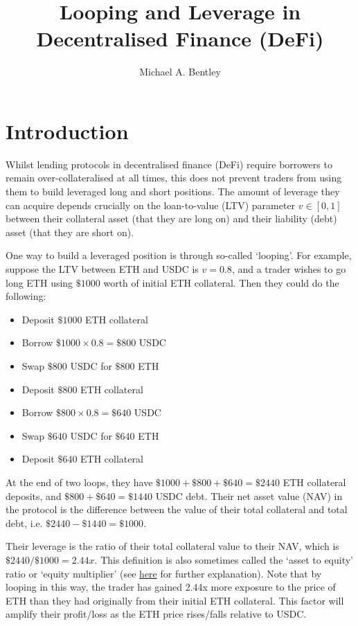 \documentclass[bibliography=numbered]{article}
\title{Looping and Leverage in Decentralised Finance (DeFi)}
\author{Michael A. Bentley}
\date{}
\begin{document}
\maketitle

\section{Introduction}

Whilst lending protocols in decentralised finance (DeFi) require borrowers to remain over-collateralised at all times, this does not prevent traders from using them to build leveraged long and short positions. The amount of leverage they can acquire depends crucially on the loan-to-value (LTV) parameter $v \in [0, 1]$ between their collateral asset (that they are long on) and their liability (debt) asset (that they are short on). 

One way to build a leveraged position is through so-called `looping'. For example, suppose the LTV between ETH and USDC is $v = 0.8$, and a trader wishes to go long ETH using $\$1000$ worth of initial ETH collateral. Then they could do the following:

\begin{itemize}
    \item Deposit $\$1000$ ETH collateral
    \item Borrow $\$1000 \times 0.8 = \$800$ USDC
    \item Swap $\$800$ USDC for $\$800$ ETH
    \item Deposit $\$800$ ETH collateral
    \item Borrow $\$800 \times 0.8 = \$640$ USDC
    \item Swap $\$640$ USDC for $\$640$ ETH
    \item Deposit $\$640$ ETH collateral
\end{itemize}

At the end of two loops, they have $\$1000 + \$800 + \$640 = \$2440$ ETH collateral deposits, and $\$800 + \$640 = \$1440$ USDC debt. Their net asset value (NAV) in the protocol is the difference between the value of their total collateral and total debt, i.e. $\$2440 - \$1440 = \$1000$. 

Their leverage is the ratio of their total collateral value to their NAV, which is $\$2440 / \$1000 = 2.44x$. This definition is also sometimes called the `asset to equity' ratio or `equity multiplier' (see \href{https://corporatefinanceinstitute.com/resources/valuation/equity-multiplier/}{here} for further explanation). Note that by looping in this way, the trader has gained 2.44x more exposure to the price of ETH than they had originally from their initial ETH collateral. This factor will amplify their profit/loss as the ETH price rises/falls relative to USDC. 
\end{document}
